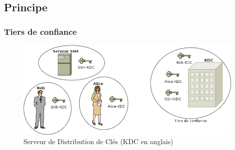 \documentclass[svgnames]{beamer}
\begin{document}
\subsection{Principe}
\begin{frame}
 \frametitle{Tiers de confiance}

  \begin{figure}[h!t]
    \begin{center}
      \includegraphics[width=\textwidth]{images/kdc.png} %
      \caption{Serveur de Distribution de Clés (KDC en anglais)}
    \end{center}    
  \end{figure}


\end{frame}
\end{document}
